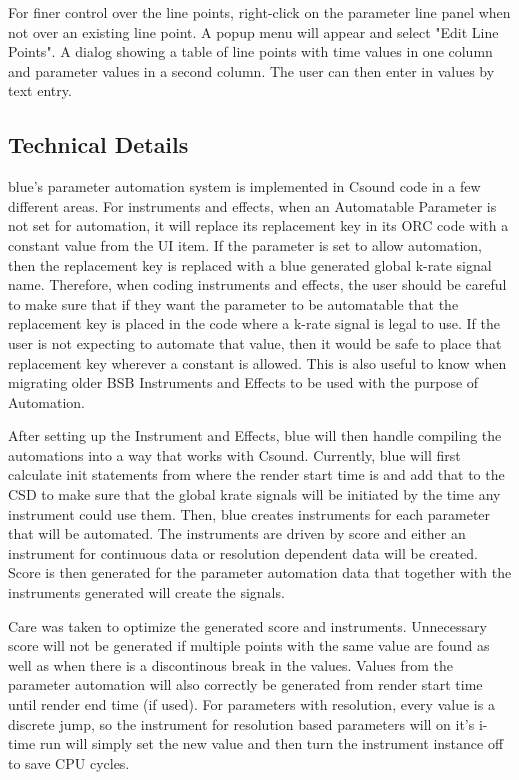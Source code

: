 For finer control over the line points, right-click on the parameter
line panel when not over an existing line point. A popup menu will
appear and select "Edit Line Points". A dialog showing a table of line
points with time values in one column and parameter values in a second
column. The user can then enter in values by text entry.

\subsection{Technical Details}

blue's parameter automation system is implemented in Csound code in a
few different areas. For instruments and effects, when an Automatable
Parameter is not set for automation, it will replace its replacement key
in its ORC code with a constant value from the UI item. If the parameter
is set to allow automation, then the replacement key is replaced with a
blue generated global k-rate signal name. Therefore, when coding
instruments and effects, the user should be careful to make sure that if
they want the parameter to be automatable that the replacement key is
placed in the code where a k-rate signal is legal to use. If the user is
not expecting to automate that value, then it would be safe to place
that replacement key wherever a constant is allowed. This is also useful
to know when migrating older BSB Instruments and Effects to be used with
the purpose of Automation.

After setting up the Instrument and Effects, blue will then handle
compiling the automations into a way that works with Csound. Currently,
blue will first calculate init statements from where the render start
time is and add that to the CSD to make sure that the global krate
signals will be initiated by the time any instrument could use them.
Then, blue creates instruments for each parameter that will be
automated. The instruments are driven by score and either an instrument
for continuous data or resolution dependent data will be created. Score
is then generated for the parameter automation data that together with
the instruments generated will create the signals.

Care was taken to optimize the generated score and instruments.
Unnecessary score will not be generated if multiple points with the same
value are found as well as when there is a discontinous break in the
values. Values from the parameter automation will also correctly be
generated from render start time until render end time (if used). For
parameters with resolution, every value is a discrete jump, so the
instrument for resolution based parameters will on it's i-time run will
simply set the new value and then turn the instrument instance off to
save CPU cycles.
